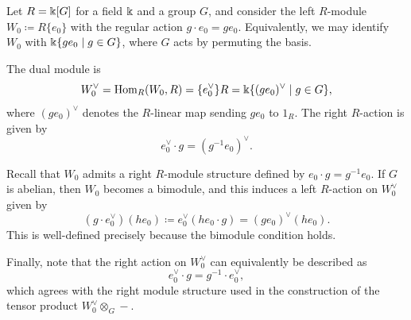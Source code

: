 \begin{example}\label{BimoduleW}
Let $R = \Bbbk[G]$ for a field $\Bbbk$ and a group $G$, and consider the left $R$-module $W_0 \coloneqq R\{e_0\}$ with the regular action $g \cdot e_0 = ge_0$. Equivalently, we may identify $W_0$ with $\Bbbk\{ge_0 \mid g \in G\}$, where $G$ acts by permuting the basis.

The dual module is
\[
W_0^\vee = \mathrm{Hom}_R(W_0,R) = \{e_0^\vee\}R = \Bbbk\{(ge_0)^\vee \mid g \in G\},
\]
where $(ge_0)^\vee$ denotes the $R$-linear map sending $ge_0$ to $1_R$. The right $R$-action is given by
\[
e_0^\vee \cdot g = (g^{-1} e_0)^\vee.
\]

Recall that $W_0$ admits a right $R$-module structure defined by $e_0 \cdot g = g^{-1} e_0$. If $G$ is abelian, then $W_0$ becomes a bimodule, and this induces a left $R$-action on $W_0^\vee$ given by
\[
(g \cdot e_0^\vee)(he_0) \coloneqq e_0^\vee(he_0 \cdot g)= (ge_0)^\vee(he_0).
\]
This is well-defined precisely because the bimodule condition holds.

Finally, note that the right action on $W_0^\vee$ can equivalently be described as
\[
e_0^\vee \cdot g = g^{-1} \cdot e_0^\vee,
\]
which agrees with the right module structure used in the construction of the tensor product $W_0^\vee \otimes_G -$.
\end{example}
